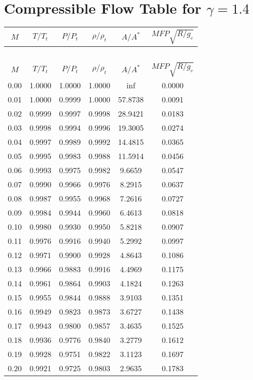 \documentclass{article}
\begin{document}
\section*{Compressible Flow Table for $\gamma = 1.4$}
\begin{longtable}{cccccc}  %

\toprule
$M$ & $T/T_t$ & $P/P_t$ & $\rho/\rho_t$ & $A/A^*$ & $MFP\sqrt{R/g_c}$ \\
\midrule
\endfirsthead
\multicolumn{6}{c}{~} \\
\toprule
$M$ & $T/T_t$ & $P/P_t$ & $\rho/\rho_t$ & $A/A^*$ & $MFP\sqrt{R/g_c}$ \\
\midrule
\endhead
0.00 & 1.0000 & 1.0000 & 1.0000 & inf & 0.0000 \\
0.01 & 1.0000 & 0.9999 & 1.0000 & 57.8738 & 0.0091 \\
0.02 & 0.9999 & 0.9997 & 0.9998 & 28.9421 & 0.0183 \\
0.03 & 0.9998 & 0.9994 & 0.9996 & 19.3005 & 0.0274 \\
0.04 & 0.9997 & 0.9989 & 0.9992 & 14.4815 & 0.0365 \\
0.05 & 0.9995 & 0.9983 & 0.9988 & 11.5914 & 0.0456 \\
0.06 & 0.9993 & 0.9975 & 0.9982 & 9.6659 & 0.0547 \\
0.07 & 0.9990 & 0.9966 & 0.9976 & 8.2915 & 0.0637 \\
0.08 & 0.9987 & 0.9955 & 0.9968 & 7.2616 & 0.0727 \\
0.09 & 0.9984 & 0.9944 & 0.9960 & 6.4613 & 0.0818 \\
0.10 & 0.9980 & 0.9930 & 0.9950 & 5.8218 & 0.0907 \\
0.11 & 0.9976 & 0.9916 & 0.9940 & 5.2992 & 0.0997 \\
0.12 & 0.9971 & 0.9900 & 0.9928 & 4.8643 & 0.1086 \\
0.13 & 0.9966 & 0.9883 & 0.9916 & 4.4969 & 0.1175 \\
0.14 & 0.9961 & 0.9864 & 0.9903 & 4.1824 & 0.1263 \\
0.15 & 0.9955 & 0.9844 & 0.9888 & 3.9103 & 0.1351 \\
0.16 & 0.9949 & 0.9823 & 0.9873 & 3.6727 & 0.1438 \\
0.17 & 0.9943 & 0.9800 & 0.9857 & 3.4635 & 0.1525 \\
0.18 & 0.9936 & 0.9776 & 0.9840 & 3.2779 & 0.1612 \\
0.19 & 0.9928 & 0.9751 & 0.9822 & 3.1123 & 0.1697 \\
0.20 & 0.9921 & 0.9725 & 0.9803 & 2.9635 & 0.1783 \\

\end{longtable}
\end{document}
